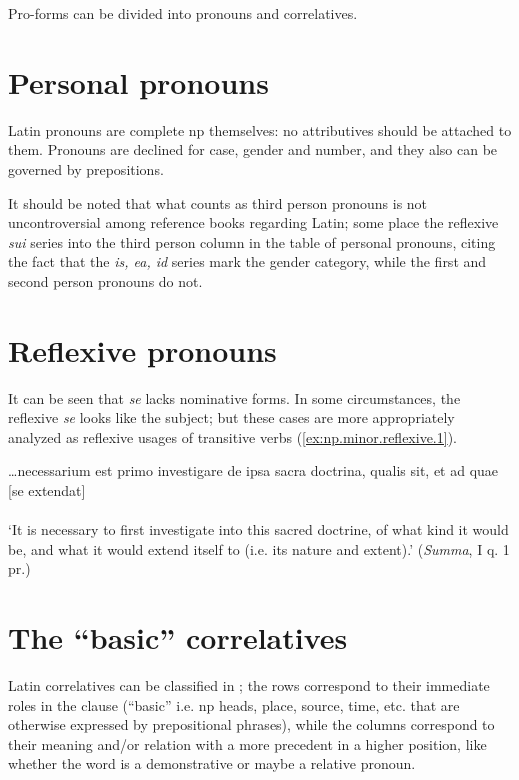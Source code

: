 \documentclass[a4paper, oneside, 12pt]{report}
\newcommand{\form}[1]{\emph{#1}}
\newcommand{\translate}[1]{`#1'}
\newcommand{\literature}[1]{\textit{#1}}
\begin{document}
Pro-forms can be divided into pronouns and correlatives.


\section{Personal pronouns}

Latin pronouns are complete \acs{np} themselves:
no attributives should be attached to them. 
Pronouns are declined for case, gender and number,
and they also can be governed by prepositions.

It should be noted that what counts as third person pronouns 
is not uncontroversial among reference books regarding Latin; 
some place the reflexive \form{sui} series into the third person column 
in the table of personal pronouns, 
citing the fact that the \form{is, ea, id} series mark the gender category, 
while the first and second person pronouns do not.


\section{Reflexive pronouns}

It can be seen that \form{se} lacks nominative forms.
In some circumstances, 
the reflexive \form{se} looks like the subject;
but these cases are more appropriately analyzed 
as reflexive usages of transitive verbs
(\ref{ex:np.minor.reflexive.1}).

\begin{exe}
    \ex\label{ex:np.minor.reflexive.1} \gll \dots necessarium est primo investigare de ipsa sacra doctrina, 
    qualis sit, et ad quae [se extendat]  \\
    \\
    \glt \translate{It is necessary to first investigate into this sacred doctrine, 
    of what kind it would be, 
    and what it would extend itself to (i.e. its nature and extent).} (\literature{Summa}, I q. 1 pr.)
\end{exe}

\section{The ``basic'' correlatives}

Latin correlatives can be classified in ;
the rows correspond to their immediate roles in the clause 
(``basic'' i.e. \ac{np} heads, 
place, source, time, etc. that are otherwise expressed by prepositional phrases),
while the columns correspond to their meaning and/or 
relation with a more precedent in a higher position,
like whether the word is a demonstrative 
or maybe a relative pronoun. 
\end{document}
